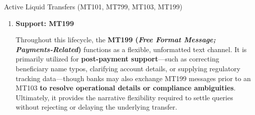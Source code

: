 \documentclass[10pt]{article}
\begin{document}
\begin{core}{Active Liquid Transfers (MT101, MT799, MT103, MT199)}
\begin{enumerate}
          \item \textbf{Support: MT199}

          Throughout this lifecycle, the \textbf{MT199 (\textit{Free Format Message; Payments-Related})} functions as a flexible, unformatted text channel. It is primarily utilized for \textbf{post-payment support}---such as correcting beneficiary name typos, clarifying account details, or supplying regulatory tracking data---though banks may also exchange MT199 messages prior to an MT103 \textbf{to resolve operational details or compliance ambiguities}. Ultimately, it provides the narrative flexibility required to settle queries without rejecting or delaying the underlying transfer.

        \end{enumerate}

      \end{core}
\end{document}
